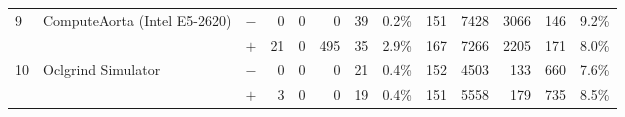 \begin{tabular}{lll | rrrrr | rrrrr }
\hline
\multirow{ 2}{*}{9} & \multirow{ 2}{*}{ComputeAorta (Intel E5-2620)} & $-$ & 0 & 0 & 0 & 39 & 0.2\%       & 151 & 7428 & 3066 & 146 & 9.2\% \\& & $+$ & 21 & 0 & 495 & 35 & 2.9\% & 167 & 7266 & 2205 & 171 & 8.0\% \\
\hline
\multirow{ 2}{*}{10} & \multirow{ 2}{*}{Oclgrind Simulator} & $-$ & 0 & 0 & 0 & 21 & 0.4\%       & 152 & 4503 & 133 & 660 & 7.6\% \\& & $+$ & 3 & 0 & 0 & 19 & 0.4\% & 151 & 5558 & 179 & 735 & 8.5\% \\
  \bottomrule
\end{tabular}

